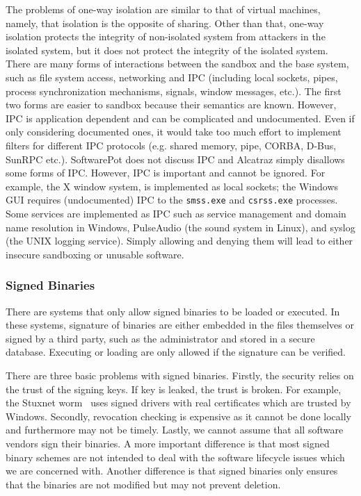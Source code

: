 The problems of one-way isolation are similar to that of
virtual machines, namely, that isolation is the opposite of sharing.
Other than that, one-way isolation protects the integrity of non-isolated
system from attackers in the isolated system,
but it does not protect the integrity of the isolated system.
There are many forms of interactions between the sandbox and the base system,
such as file system access, networking and IPC
(including local sockets, pipes, process synchronization mechanisms,
signals, window messages, etc.).
The first two forms are easier to sandbox because their semantics are known.
However, IPC is application dependent and can be complicated and
undocumented.
Even if only considering documented ones,
it would take too much effort to implement filters for different IPC
protocols (e.g. shared memory, pipe, CORBA, D-Bus, SunRPC etc.).
SoftwarePot does not discuss IPC and Alcatraz simply disallows some forms of IPC.
However, IPC is important and cannot be ignored.
For example, the X window system, is implemented as local sockets;
the Windows GUI requires (undocumented) IPC to the {\tt smss.exe}
and {\tt csrss.exe} processes.
Some services are implemented as IPC such as
service management and domain name resolution in Windows,
PulseAudio (the sound system in Linux),
and syslog (the UNIX logging service).
Simply allowing and denying them will lead to either insecure sandboxing or
unusable software.

\subsubsection{Signed Binaries}
\label{sec:binint-signing}

There are systems \cite{halim2008lightweight,apvrille2004digsig,williams2002anti,doorn01signedexecutables,nanda2006fcd}
that only allow signed binaries to be loaded or executed.
In these systems, signature of binaries are either embedded
in the files themselves or signed by a third party, such
as the administrator and stored in a secure database.
Executing or loading are only allowed if the signature can be verified.

There are three basic problems with signed binaries.
Firstly, the security relies on the trust of the signing keys.
If key is leaked, the trust is broken.
For example, the Stuxnet worm~\cite{matrosov2010stuxnet} uses
signed drivers with real certificates which are trusted by Windows.
Secondly, revocation checking is expensive as it cannot be done
locally and furthermore may not be timely.
Lastly, we cannot assume that all software vendors sign their binaries.
A more important difference is that most signed binary schemes are not
intended to deal with the software lifecycle issues which we are concerned with.
Another difference is that signed binaries
only ensures that the binaries are not modified but
may not prevent deletion.

